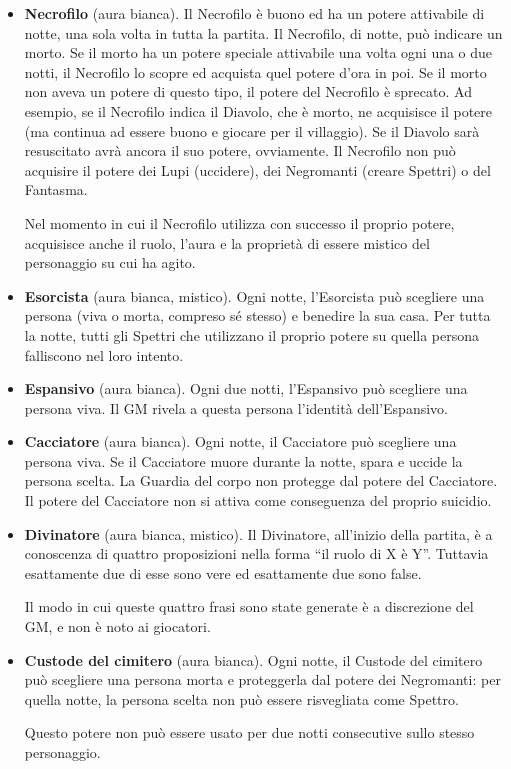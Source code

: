 \documentclass[a4paper,10pt]{article}
\begin{document}
\begin{itemize}

 \item {\bf Necrofilo} (aura bianca). Il Necrofilo è buono ed ha un potere attivabile di notte, una sola volta in tutta la partita.
 Il Necrofilo, di notte, può indicare un morto. Se il morto ha un potere speciale attivabile una volta ogni una o due notti, il Necrofilo lo scopre ed acquista quel potere d'ora in poi. Se il morto non aveva un potere di questo tipo, il potere del Necrofilo è sprecato. Ad esempio, se il Necrofilo indica il Diavolo, che è morto, ne acquisisce il potere (ma continua ad essere buono e giocare per il villaggio). Se il Diavolo sarà resuscitato avrà ancora il suo potere, ovviamente.
 Il Necrofilo non può acquisire il potere dei Lupi (uccidere), dei Negromanti (creare Spettri) o del Fantasma.
 
 Nel momento in cui il Necrofilo utilizza con successo il proprio potere, acquisisce anche il ruolo, l'aura e la proprietà di essere mistico del personaggio su cui ha agito.

 \item {\bf Esorcista} (aura bianca, mistico). Ogni notte, l'Esorcista può scegliere una persona (viva o morta, compreso sé stesso) e benedire la sua casa.
 Per tutta la notte, tutti gli Spettri che utilizzano il proprio potere su quella persona falliscono nel loro intento.
 
 \item {\bf Espansivo} (aura bianca). Ogni due notti, l'Espansivo può scegliere una persona viva. Il GM rivela a questa persona l'identità dell'Espansivo.

 \item {\bf Cacciatore} (aura bianca). Ogni notte, il Cacciatore può scegliere una persona viva. Se il Cacciatore muore durante la notte, spara e uccide la persona scelta.
 La Guardia del corpo non protegge dal potere del Cacciatore.
 Il potere del Cacciatore non si attiva come conseguenza del proprio suicidio.

 \item {\bf Divinatore} (aura bianca, mistico). Il Divinatore, all'inizio della partita, è a conoscenza di quattro proposizioni nella forma ``il ruolo di X è Y''. Tuttavia esattamente due di esse sono vere ed esattamente due sono false.
 
 Il modo in cui queste quattro frasi sono state generate è a discrezione del GM, e non è noto ai giocatori.
 
 \item {\bf Custode del cimitero} (aura bianca). Ogni notte, il Custode del cimitero può scegliere una persona morta e proteggerla dal potere dei Negromanti: per quella notte, la persona scelta non può essere risvegliata come Spettro.
 
 Questo potere non può essere usato per due notti consecutive sullo stesso personaggio.

 
\end{itemize}
\end{document}
